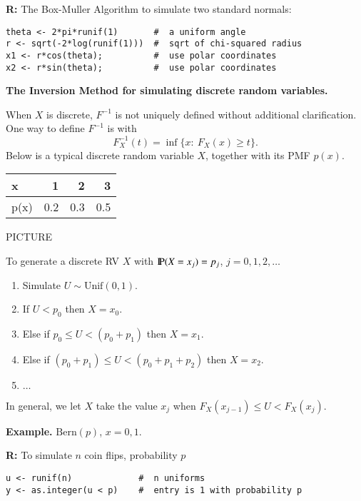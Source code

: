 \documentclass[captions=tableheading]{scrbook}
\begin{document}
\begin{itemize}
\textbf{R:} The Box-Muller Algorithm to simulate two standard normals:

\begin{verbatim}
theta <- 2*pi*runif(1)       #  a uniform angle
r <- sqrt(-2*log(runif(1)))  #  sqrt of chi-squared radius
x1 <- r*cos(theta);          #  use polar coordinates
x2 <- r*sin(theta);          #  use polar coordinates
\end{verbatim}


\textbf{The Inversion Method for simulating discrete random variables.}  

When $X$ is discrete, $F^{-1}$ is not uniquely defined without additional clarification. One way to define $F^{-1}$ is with 
\[
F_{X}^{-1}(t)=\inf\{x:\ F_{X}(x)\geq t\}.
\]
Below is a typical discrete random variable $X$, together with its PMF $p(x)$.


\begin{center}
\begin{tabular}{lrrr}
 x     &    1  &    2  &    3  \\
\hline
 p(x)  &  0.2  &  0.3  &  0.5  \\
\end{tabular}
\end{center}



PICTURE 

\vspace{1.5in}

To generate a discrete RV $X$ with $\P(X=x_{j})=p_{j}$, $j=0,1,2,\ldots$

\begin{enumerate}
\item Simulate $U \sim \mathrm{Unif}(0,1)$.
\item If $U<p_{0}$ then $X=x_{0}$.
\item Else if $p_{0}\leq U<(p_{0}+p_{1})$ then $X=x_{1}$.
\item Else if $(p_{0}+p_{1})\leq U<(p_{0}+p_{1}+p_{2})$ then $X=x_{2}$.
\item $\ldots$
\end{enumerate}
 
In general, we let $X$ take the value $x_{j}$ when $F_{X}(x_{j-1})\leq U<F_{X}(x_{j})$.

\textbf{Example.} $\mathrm{Bern}(p)$, $x=0,1$.
 
\textbf{R:} To simulate $n$ coin flips, probability $p$

\begin{verbatim}
u <- runif(n)             #  n uniforms
y <- as.integer(u < p)    #  entry is 1 with probability p
\end{verbatim}



\end{itemize}
\end{document}
